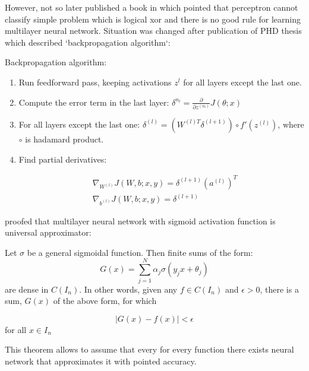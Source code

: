 However, not so later \textcite{minsky} published a book in which pointed that perceptron cannot classify simple problem which is logical xor and there is no good rule for learning multilayer neural network.
Situation was changed after publication of PHD thesis \parencite{werbos} which described `backpropagation algorithm`:

\begin{algorithm}
Backpropagation algorithm:
	\begin{enumerate}
		\item Run feedforward pass, keeping activations $z^{l}$ for all layers except the last one.
		\item Compute the error term in the last layer: $\delta^{n_l}=\frac{\partial}{\partial z^{(n_l)}} J(\theta;x)$ 
		\item For all layers except the last one: $\delta^{(l)}=(W^{(l)T}\delta^{(l+1)})\circ f'(z^{(l)})$, where $\circ$ is hadamard product.
		\item Find partial derivatives: 

\begin{align*}
& \nabla_{W^{(l)}}J(W,b;x,y)=\delta^{(l+1)}(a^{(l)})^T \\
& \nabla_{b^{(l)}}J(W,b;x,y)=\delta^{(l+1)} 
\end{align*}
	\end{enumerate}
\end{algorithm}


\textcite{cybenko_approximation_1989} proofed that multilayer neural network with sigmoid activation function is universal approximator:
\begin{theorem}

Let $\sigma$ be a general sigmoidal function. Then finite sums of the form:
\begin{equation}
	G(x)=\sum\limits^N_{j=1}\alpha_j\sigma(y_jx+\theta_j)
\end{equation}
are dense in $C(I_n)$. In other words, given any $f \in C(I_n)$ and $\epsilon > 0$, there is a sum, $G(x)$ of the above form, for which

\begin{equation}
	\left|G(x) - f(x)\right| < \epsilon
\end{equation}
for all $x \in I_n$

This theorem allows to assume that every for every function there exists neural network that approximates it with pointed accuracy.
\end{theorem}

